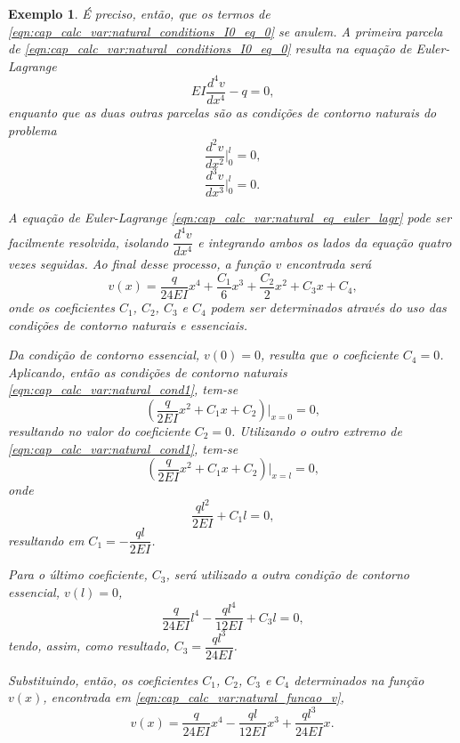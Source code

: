 \documentclass[
	12pt,				%
	openright,			%
    twoside,			%
	a4paper,			%
	english,			%
	french,				%
	spanish,			%
	brazil				%
	]{abntex2}
\newtheorem{exemplo}{Exemplo}
\numberwithin{lema}{chapter}
\numberwithin{teorema}{chapter}
\numberwithin{definicao}{chapter}
\numberwithin{exemplo}{chapter}
\numberwithin{figure}{chapter}
\begin{document}
\begin{exemplo}
	É preciso, então, que os termos de \eqref{eqn:cap_calc_var:natural_conditions_I0_eq_0} se anulem. A primeira parcela de \eqref{eqn:cap_calc_var:natural_conditions_I0_eq_0} resulta na equação de Euler-Lagrange
	\begin{equation}
		\label{eqn:cap_calc_var:natural_eq_euler_lagr}
		EI\frac{d^4v}{dx^4} - q = 0
		\text{,}
	\end{equation}
	enquanto que as duas outras parcelas são as condições de contorno naturais do problema
	\begin{equation}
		\label{eqn:cap_calc_var:natural_cond1}
		\frac{d^2 v}{dx^2}\Big |_{0}^{l} = 0
		\text{,}
	\end{equation}
	\begin{equation}
		\label{eqn:cap_calc_var:natural_cond2}
		\frac{d^3 v}{dx^3}\Big |_{0}^{l} = 0
		\text{.}
	\end{equation}
	
	A equação de Euler-Lagrange \eqref{eqn:cap_calc_var:natural_eq_euler_lagr} pode ser facilmente resolvida, isolando $\dfrac{d^4 v}{dx^4}$ e integrando ambos os lados da equação quatro vezes seguidas. Ao final desse processo, a função $v$ encontrada será
	\begin{equation}
		\label{eqn:cap_calc_var:natural_funcao_v}
		v(x)=\frac{q}{24EI}x^4 + \frac{C_1}{6}x^3 + \frac{C_2}{2}x^2 + C_3x + C_4
		\text{,}
	\end{equation}
	onde os coeficientes $C_1$, $C_2$, $C_3$ e $C_4$ podem ser determinados através do uso das condições de contorno naturais e essenciais.
	
	Da condição de contorno essencial, $v(0)=0$, resulta que o coeficiente $C_4=0$. Aplicando, então as condições de contorno naturais \eqref{eqn:cap_calc_var:natural_cond1}, tem-se
	$$
		\left (
			\frac{q}{2EI}x^2 + C_1x + C_2
		\right ) \Big |_{x=0}
		= 0
		\text{,}
	$$
	resultando no valor do coeficiente $C_2=0$. Utilizando o outro extremo de \eqref{eqn:cap_calc_var:natural_cond1}, tem-se
	$$
		\left (
			\frac{q}{2EI}x^2 + C_1x + C_2
		\right ) \Big |_{x=l}
		=0
		\text{,}
	$$
	onde
	$$
		\frac{ql^2}{2EI}+C_1l=0
		\text{,}
	$$
	resultando em $C_1=-\dfrac{ql}{2EI}$.
	
	Para o último coeficiente, $C_3$, será utilizado a outra condição de contorno essencial, $v(l)=0$,
	$$
		\frac{q}{24EI}l^4
		-
		\frac{ql^4}{12EI}
		+
		C_3l
		= 0
		\text{,}
	$$
	tendo, assim, como resultado, $C_3=\dfrac{ql^3}{24EI}$.
	
	Substituindo, então, os coeficientes $C_1$, $C_2$, $C_3$ e $C_4$ determinados na função $v(x)$, encontrada em \eqref{eqn:cap_calc_var:natural_funcao_v},
	$$
		v(x) = 
			\frac{q}{24EI} x^4
			-
			\frac{ql}{12EI} x^3
			+
			\frac{ql^3}{24EI} x
			\text{.}
	$$
\end{exemplo}
\end{document}

